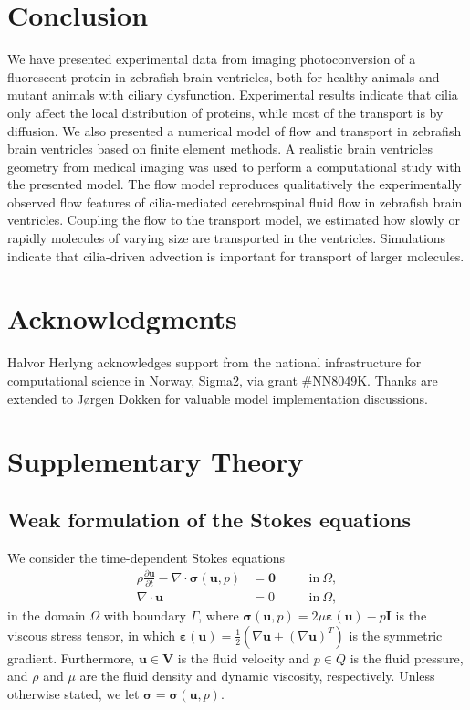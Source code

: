 \documentclass[fleqn]{wlscirep}
\newcommand{\pdifft}[1]{\frac{\partial  #1}{\partial t}}
\newcommand{\uu}{\mathbf{u}}
\newcommand{\VV}{\mathbf{V}}
\newcommand{\bsig}{\bm{\sigma}}
\newcommand{\beps}{\bm{\varepsilon}}
\begin{document}
\section*{Conclusion}
We have presented experimental data from imaging photoconversion of a fluorescent protein in zebrafish brain ventricles, both for healthy animals and mutant animals with ciliary dysfunction. Experimental results indicate that cilia only affect the local distribution of proteins, while most of the transport is by diffusion. We also presented a numerical model of flow and transport in zebrafish brain ventricles based on finite element methods. A realistic brain ventricles geometry from medical imaging was used to perform a computational study with the presented model. The flow model reproduces qualitatively the experimentally observed flow features of cilia-mediated cerebrospinal fluid flow in zebrafish brain ventricles. Coupling the flow to the transport model, we estimated how slowly or rapidly molecules of varying size are transported in the ventricles. Simulations indicate that cilia-driven advection is important for transport of larger molecules.


\section*{Acknowledgments}
Halvor Herlyng acknowledges support from the national infrastructure for computational science in Norway, Sigma2, via grant \#NN8049K. Thanks are extended to J\o rgen Dokken for valuable model implementation discussions.
\newpage


\appendix
\section{Supplementary Theory}
\subsection{Weak formulation of the Stokes equations}\label{subsec:appendixA1}
We consider the time-dependent Stokes equations
\begin{subequations}
\begin{alignat}{2}
   \rho\pdifft{\uu} - \nabla \cdot \bsig(\uu, p) &= \mathbf{0} \quad &&\mathrm{in} \ \Omega, \label{eq:BDM_stokes_mom}\\
  \nabla \cdot \uu &= 0 \quad &&\mathrm{in} \ \Omega, \label{eq:BDM_stokes_div} 
\end{alignat}
\label{eq:appendix_stokes_eqs}%
\end{subequations}%
in the domain $\Omega$ with boundary $\Gamma$, where $\bsig(\uu, p) = 2\mu\beps(\uu) - p\mathbf{I}$ is the viscous stress tensor, in which $\beps(\uu) = \frac{1}{2}(\nabla\uu + (\nabla\uu)^T)$ is the symmetric gradient. Furthermore, $\uu\in\VV$ is the fluid velocity and $p\in Q$ is the fluid pressure, and $\rho$ and $\mu$ are the fluid density and dynamic viscosity, respectively. Unless otherwise stated, we let $\bsig = \bsig(\uu, p)$. 
\end{document}
